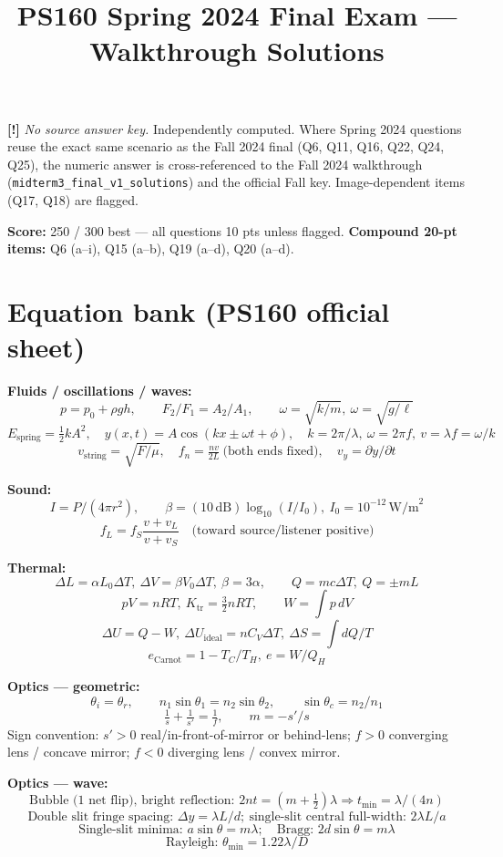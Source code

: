 \documentclass[11pt]{article}
\title{PS160 Spring 2024 Final Exam --- Walkthrough Solutions}
\author{}
\date{}
\newcommand{\warn}{\textbf{[!]}}
\begin{document}
\maketitle

\warn{} \emph{No source answer key.} Independently computed. Where Spring 2024 questions reuse the exact same scenario as the Fall 2024 final (Q6, Q11, Q16, Q22, Q24, Q25), the numeric answer is cross-referenced to the Fall 2024 walkthrough (\texttt{midterm3\_final\_v1\_solutions}) and the official Fall key. Image-dependent items (Q17, Q18) are flagged.

\medskip
\noindent\textbf{Score:} 250 / 300 best --- all questions 10 pts unless flagged. \textbf{Compound 20-pt items:} Q6 (a--i), Q15 (a--b), Q19 (a--d), Q20 (a--d).

\section*{Equation bank (PS160 official sheet)}

\textbf{Fluids / oscillations / waves:}
\[ p = p_0 + \rho g h, \qquad F_2/F_1 = A_2/A_1, \qquad \omega=\sqrt{k/m},\ \omega=\sqrt{g/\ell} \]
\[ E_{\text{spring}}=\tfrac12 kA^2,\quad y(x,t)=A\cos(kx \pm \omega t + \phi),\quad k=2\pi/\lambda,\ \omega=2\pi f,\ v=\lambda f=\omega/k \]
\[ v_{\text{string}}=\sqrt{F/\mu},\quad f_n=\tfrac{nv}{2L}\ \text{(both ends fixed)},\quad v_y=\partial y/\partial t \]

\textbf{Sound:}
\[ I = P/(4\pi r^2),\qquad \beta = (10\,\text{dB})\log_{10}(I/I_0),\ I_0 = 10^{-12}\,\text{W/m}^2 \]
\[ f_L = f_S\frac{v+v_L}{v+v_S}\quad\text{(toward source/listener positive)} \]

\textbf{Thermal:}
\[ \Delta L=\alpha L_0\Delta T,\ \Delta V=\beta V_0\Delta T,\ \beta=3\alpha,\qquad Q=mc\Delta T,\ Q=\pm mL \]
\[ pV=nRT,\ K_{\text{tr}}=\tfrac32 nRT,\qquad W=\int p\,dV \]
\[ \Delta U=Q-W,\ \Delta U_{\text{ideal}}=nC_V\Delta T,\ \Delta S=\int dQ/T \]
\[ e_{\text{Carnot}} = 1-T_C/T_H,\ e=W/Q_H \]

\textbf{Optics --- geometric:}
\[ \theta_i=\theta_r,\qquad n_1\sin\theta_1=n_2\sin\theta_2,\qquad \sin\theta_c = n_2/n_1 \]
\[ \tfrac1s+\tfrac1{s'}=\tfrac1f,\qquad m=-s'/s \]
Sign convention: $s'>0$ real/in-front-of-mirror or behind-lens; $f>0$ converging lens / concave mirror; $f<0$ diverging lens / convex mirror.

\textbf{Optics --- wave:}
\[ \text{Bubble (1 net flip), bright reflection: } 2nt=(m+\tfrac12)\lambda \Rightarrow t_{\min}=\lambda/(4n) \]
\[ \text{Double slit fringe spacing: } \Delta y=\lambda L/d;\ \text{single-slit central full-width: } 2\lambda L/a \]
\[ \text{Single-slit minima: } a\sin\theta=m\lambda;\quad \text{Bragg: } 2d\sin\theta = m\lambda \]
\[ \text{Rayleigh: } \theta_{\min} = 1.22\lambda/D \]
\end{document}
